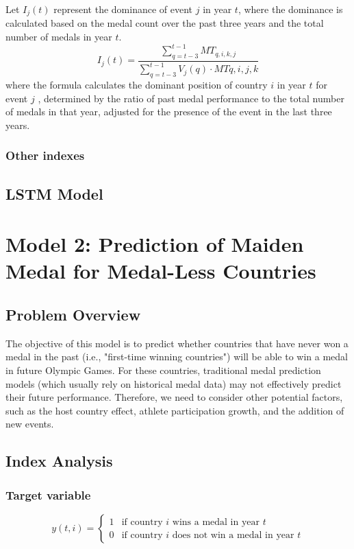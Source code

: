 \documentclass{mcmthesis}
\begin{document}
Let \( I_j(t) \) represent the dominance of event \( j \) in year \( t \), where the dominance is calculated based on the medal count over the past three years and the total number of medals in year \( t \).
\[
I_j(t) = \frac{\sum_{q=t-3}^{t-1} MT_{q,i,k,j}}{\sum_{q=t-3}^{t-1}V_j(q) \cdot MT{q,i,j,k}} 
\]
where the formula calculates the dominant position of country $i$ in year  $t$  for event  $j$ , determined by the ratio of past medal performance to the total number of medals in that year, adjusted for the presence of the event in the last three years.







\subsubsection{Other indexes}




\subsection{LSTM Model}







\section{Model 2: Prediction of Maiden Medal for Medal-Less Countries}


\subsection{Problem Overview}
The objective of this model is to predict whether countries that have never won a medal in the past (i.e., "first-time winning countries") will be able to win a medal in future Olympic Games. For these countries, traditional medal prediction models (which usually rely on historical medal data) may not effectively predict their future performance. Therefore, we need to consider other potential factors, such as the host country effect, athlete participation growth, and the addition of new events.


\subsection{Index Analysis}


\subsubsection{Target variable}
\[
y(t,i) = 
\begin{cases} 
	1 & \text{if country } i \text{ wins a medal in year } t \\ 
	0 & \text{if country } i \text{ does not win a medal in year } t 
\end{cases}
\]
\end{document}
